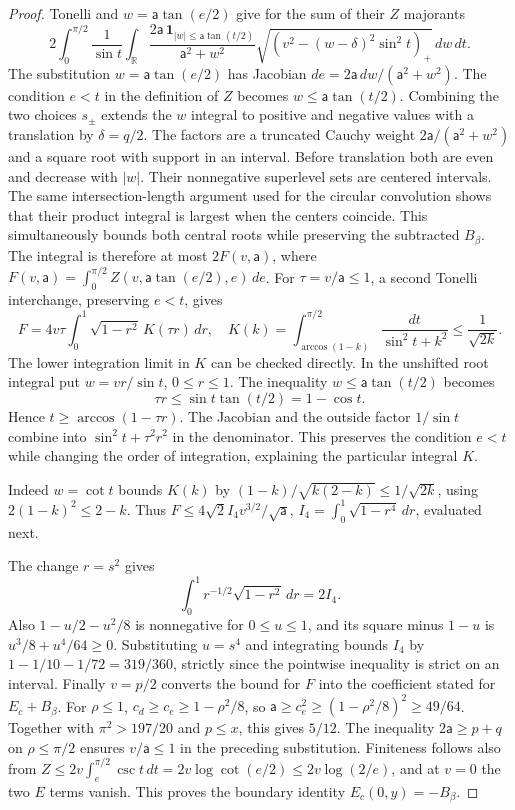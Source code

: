 \begin{proof}
Tonelli and $w=\mathsf{a}\tan(e/2)$ give for the sum of their $Z$ majorants
\[
 2\int_0^{\pi/2}\frac1{\sin t}\int_{\mathbb R}
 \frac{2\mathsf{a}\,\mathbf1_{|w|\leq\mathsf a\tan(t/2)}}{\mathsf{a}^2+w^2}
        \sqrt{(v^2-(w-\delta)^2\sin^2t)_+}\,dw\,dt.
\]
The substitution $w=\mathsf{a}\tan(e/2)$ has Jacobian
$de=2\mathsf{a}\,dw/(\mathsf{a}^2+w^2)$. The condition $e<t$ in the definition
of $Z$ becomes $w\leq \mathsf{a}\tan(t/2)$. Combining the two choices
$s_\pm$ extends the $w$ integral to positive and negative values
with a translation by $\delta=q/2$. The factors are a truncated
Cauchy weight $2\mathsf{a}/(\mathsf{a}^2+w^2)$ and a square root with support in an
interval. Before translation both are even and decrease with $|w|$.
Their nonnegative superlevel sets are centered intervals. The same
intersection-length argument used for the circular convolution shows
that their product integral is largest when the centers coincide.
This simultaneously bounds both central roots while preserving the
subtracted $B_\beta$. The integral is therefore at most
$2F(v,\mathsf a)$, where $F(v,\mathsf{a})=\int_0^{\pi/2}Z(v,\mathsf{a}\tan(e/2),e)\,de$.
For $\tau=v/\mathsf{a}\leq1$, a second Tonelli interchange, preserving
$e<t$, gives
\[
 F=4v\tau\int_0^1\sqrt{1-r^2}\,K(\tau r)\,dr,
 \quad K(k)=\int_{\arccos(1-k)}^{\pi/2}\frac{dt}{\sin^2t+k^2}
 \leq\frac1{\sqrt{2k}}.
\]
The lower integration limit in $K$ can be checked directly. In the
unshifted root integral put $w=vr/\sin t$, $0\leq r\leq1$.
The inequality $w\leq \mathsf{a}\tan(t/2)$ becomes
\[
 \tau r\leq\sin t\tan(t/2)=1-\cos t.
\]
Hence $t\geq\arccos(1-\tau r)$. The Jacobian and the outside
factor $1/\sin t$ combine into $\sin^2t+\tau^2r^2$ in the
denominator. This preserves the condition $e<t$ while changing the
order of integration, explaining the particular integral $K$.

Indeed $w=\cot t$ bounds $K(k)$ by
$(1-k)/\sqrt{k(2-k)}\leq1/\sqrt{2k}$, using
$2(1-k)^2\leq2-k$. Thus
$F\leq4\sqrt2 I_4v^{3/2}/\sqrt {\mathsf{a}}$,
$I_4=\int_0^1\sqrt{1-r^4}\,dr$, evaluated next.

The change $r=s^2$ gives
\[
 \int_0^1r^{-1/2}\sqrt{1-r^2}\,dr=2I_4.
\]
Also $1-u/2-u^2/8$ is nonnegative for $0\leq u\leq1$, and its
square minus $1-u$ is $u^3/8+u^4/64\geq0$. Substituting $u=s^4$
and integrating bounds $I_4$ by
$1-1/10-1/72=319/360$, strictly since the pointwise inequality is
strict on an interval. Finally $v=p/2$ converts the bound for $F$
into the coefficient stated for $E_c+B_\beta$.
For $\rho\leq1$, $c_d\geq c_e\geq1-\rho^2/8$, so
$\mathsf a\geq c_e^2\geq(1-\rho^2/8)^2\geq49/64$.
Together with
$\pi^2>197/20$ and $p\leq x$, this gives $5/12$.
The inequality $2\mathsf a\geq p+q$ on $\rho\leq\pi/2$ ensures
$v/\mathsf a\leq1$ in the preceding substitution. Finiteness follows also from
$Z\leq2v\int_e^{\pi/2}\csc t\,dt
 =2v\log\cot(e/2)\leq2v\log(2/e)$, and at $v=0$ the two $E$ terms
vanish. This proves the boundary identity $E_c(0,y)=-B_\beta$.
\end{proof}

